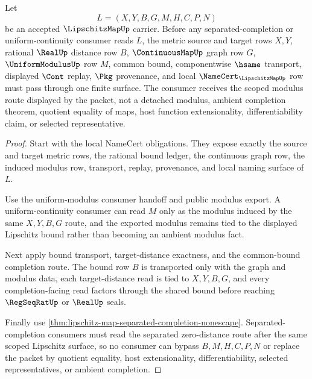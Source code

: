 \begin{theorem}
\label{thm:lipschitz-map-scoped-modulus-route}
Let
$$
L=(X,Y,B,G,M,H,C,P,N)
$$
be an accepted $\LipschitzMapUp$ carrier. Before any separated-completion or uniform-continuity consumer reads $L$, the metric source and target rows $X,Y$, rational $\RealUp$ distance row $B$, $\ContinuousMapUp$ graph row $G$, $\UniformModulusUp$ row $M$, common bound, componentwise $\hsame$ transport, displayed $\Cont$ replay, $\Pkg$ provenance, and local $\NameCert_{\LipschitzMapUp}$ row must pass through one finite surface. The consumer receives the scoped modulus route displayed by the packet, not a detached modulus, ambient completion theorem, quotient equality of maps, host function extensionality, differentiability claim, or selected representative.
\end{theorem}
\begin{proof}
Start with the local NameCert obligations. They expose exactly the source and target metric rows, the rational bound ledger, the continuous graph row, the induced modulus row, transport, replay, provenance, and local naming surface of $L$.

Use the uniform-modulus consumer handoff and public modulus export. A uniform-continuity consumer can read $M$ only as the modulus induced by the same $X,Y,B,G$ route, and the exported modulus remains tied to the displayed Lipschitz bound rather than becoming an ambient modulus fact.

Next apply bound transport, target-distance exactness, and the common-bound completion route. The bound row $B$ is transported only with the graph and modulus data, each target-distance read is tied to $X,Y,B,G$, and every completion-facing read factors through the shared bound before reaching $\RegSeqRatUp$ or $\RealUp$ seals.

Finally use \autoref{thm:lipschitz-map-separated-completion-nonescape}. Separated-completion consumers must read the separated zero-distance route after the same scoped Lipschitz surface, so no consumer can bypass $B,M,H,C,P,N$ or replace the packet by quotient equality, host extensionality, differentiability, selected representatives, or ambient completion.
\end{proof}


